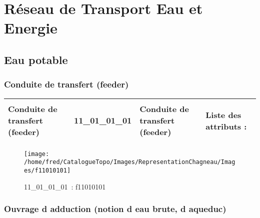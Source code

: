 \documentclass[12pt,titlepage]{book}
\begin{document}
\chapter{Réseau de Transport Eau et Energie}
\section{\large Eau potable}
\subsection{Conduite de transfert (feeder)}
\noindent
\vspace{\baselineskip}

\renewcommand{\arraystretch}{1.2}
\begin{supertabular}{|p{10cm}|c|p{13cm}|p{12cm}|}
 Conduite de transfert (feeder) & 11\_01\_01\_01 & Conduite de transfert (feeder) & Liste des attributs :
\begin{enumerate}
\end{enumerate}
\\
\hline
\end{supertabular}
\begin{figure}[h!]
  \hfill         %
  \begin{minipage}[t]{3cm}
    \begin{center}
      \texttt{[image: /home/fred/CatalogueTopo/Images/RepresentationChagneau/Images/f11010101]}
      \caption[~11\_01\_01\_01]{\small{11\_01\_01\_01~:} \tiny{f11010101}}\label{f11010101}
    \end{center}
  \end{minipage}
\end{figure}


\subsection{Ouvrage d adduction (notion d eau brute, d aqueduc)}
\noindent
\vspace{\baselineskip}
\end{document}

